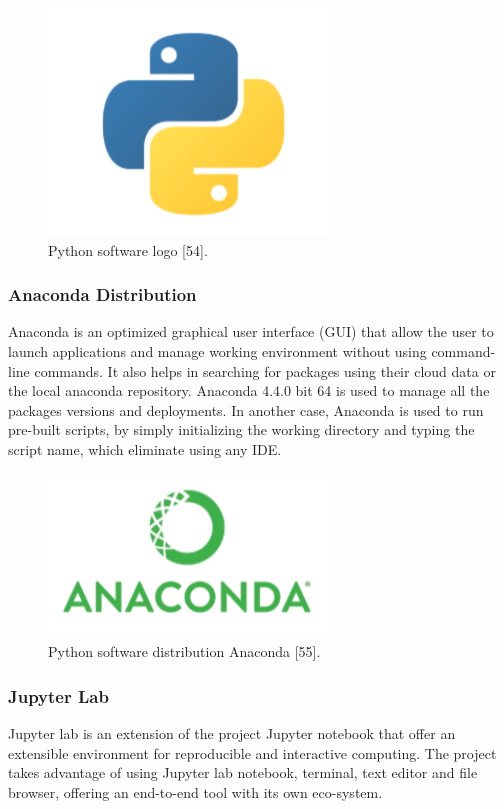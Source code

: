\begin{figure}[ht]
\centering
\includegraphics{Figures/python}
\decoRule
\caption[Python software logo "54"]{Python software logo [54].}
\label{fig:la}
\end{figure}

\subsubsection{Anaconda Distribution}
\hspace{5mm} Anaconda is an optimized graphical user interface (GUI) that allow the user to launch applications and manage working environment without using command-line commands. It also helps in searching for packages using their cloud data or the local anaconda repository. Anaconda 4.4.0 bit 64 is used to manage all the packages versions and deployments. In another case, Anaconda is used to run pre-built scripts, by simply initializing the working directory and typing the script name, which eliminate using any IDE.
\begin{figure}[ht]
\centering
\includegraphics{Figures/anaconda}
\decoRule
\caption[Python software distribution Anaconda "55".]{Python software distribution Anaconda [55].}
\label{fig:la}
\end{figure}
\subsubsection{Jupyter Lab}
\hspace{5mm} Jupyter lab is an extension of the project Jupyter notebook that offer an extensible environment for reproducible and interactive computing. The project takes advantage of using Jupyter lab notebook, terminal, text editor and file browser, offering an end-to-end tool with its own eco-system.\\

